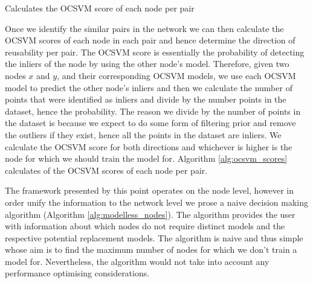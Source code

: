 \documentclass{mpaper}
\begin{document}
\begin{algorithm}
    \DontPrintSemicolon
    \caption{Calculates the OCSVM score of each node per pair
    }\label{alg:ocsvm_scores}
    
    
\end{algorithm}

Once we identify the similar pairs in the network we can then calculate the OCSVM scores of each node in each pair and hence determine the direction of reusability per pair. The OCSVM score is essentially the probability of detecting the inliers of the node by using the other node's model.  Therefore, given two nodes $x$ and $y$, and their corresponding OCSVM models, we use each OCSVM model to predict the other node's inliers and then we calculate the number of points that were identified as inliers and divide by the number points in the dataset, hence the probability. The reason we divide by the number of points in the dataset is because we expect to do some form of filtering prior and remove the outliers if they exist, hence all the points in the dataset are inliers. We calculate the OCSVM score for both directions and whichever is higher is the node for which we should train the model for. Algorithm \ref{alg:ocsvm_scores} calculates of the OCSVM scores of each node per pair.

The framework presented by this point operates on the node level, however in order unify the information to the network level we prose a naive decision making algorithm (Algorithm \ref{alg:modelless_nodes}). The algorithm provides the user with information about which nodes do not require distinct models and the respective potential replacement models. The algorithm is naive and thus simple whose aim is to find the maximum number of nodes for which we don't train a model for. Nevertheless, the algorithm would not take into account any performance optimising considerations. 
\end{document}
